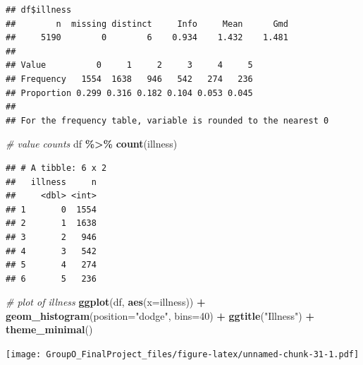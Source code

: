 \documentclass[
]{article}
\newenvironment{Shaded}{\begin{snugshade}}{\end{snugshade}}
\newcommand{\AttributeTok}[1]{\textcolor[rgb]{0.13,0.29,0.53}{#1}}
\newcommand{\CommentTok}[1]{\textcolor[rgb]{0.56,0.35,0.01}{\textit{#1}}}
\newcommand{\DecValTok}[1]{\textcolor[rgb]{0.00,0.00,0.81}{#1}}
\newcommand{\FunctionTok}[1]{\textcolor[rgb]{0.13,0.29,0.53}{\textbf{#1}}}
\newcommand{\NormalTok}[1]{#1}
\newcommand{\OtherTok}[1]{\textcolor[rgb]{0.56,0.35,0.01}{#1}}
\newcommand{\SpecialCharTok}[1]{\textcolor[rgb]{0.81,0.36,0.00}{\textbf{#1}}}
\newcommand{\StringTok}[1]{\textcolor[rgb]{0.31,0.60,0.02}{#1}}
\begin{document}
\begin{verbatim}
## df$illness 
##        n  missing distinct     Info     Mean      Gmd 
##     5190        0        6    0.934    1.432    1.481 
##                                               
## Value          0     1     2     3     4     5
## Frequency   1554  1638   946   542   274   236
## Proportion 0.299 0.316 0.182 0.104 0.053 0.045
## 
## For the frequency table, variable is rounded to the nearest 0
\end{verbatim}

\begin{Shaded}
\begin{Highlighting}[]
\CommentTok{\# value counts}
\NormalTok{df }\SpecialCharTok{\%\textgreater{}\%} \FunctionTok{count}\NormalTok{(illness)}
\end{Highlighting}
\end{Shaded}

\begin{verbatim}
## # A tibble: 6 x 2
##   illness     n
##     <dbl> <int>
## 1       0  1554
## 2       1  1638
## 3       2   946
## 4       3   542
## 5       4   274
## 6       5   236
\end{verbatim}

\begin{Shaded}
\begin{Highlighting}[]
\CommentTok{\# plot of illness}
\FunctionTok{ggplot}\NormalTok{(df, }\FunctionTok{aes}\NormalTok{(}\AttributeTok{x=}\NormalTok{illness)) }\SpecialCharTok{+}
  \FunctionTok{geom\_histogram}\NormalTok{(}\AttributeTok{position=}\StringTok{"dodge"}\NormalTok{, }\AttributeTok{bins=}\DecValTok{40}\NormalTok{) }\SpecialCharTok{+}
  \FunctionTok{ggtitle}\NormalTok{(}\StringTok{"Illness"}\NormalTok{) }\SpecialCharTok{+}
  \FunctionTok{theme\_minimal}\NormalTok{()}
\end{Highlighting}
\end{Shaded}

\texttt{[image: GroupO\_FinalProject\_files/figure-latex/unnamed-chunk-31-1.pdf]}

\begin{Shaded}
\end{Shaded}
\end{document}
